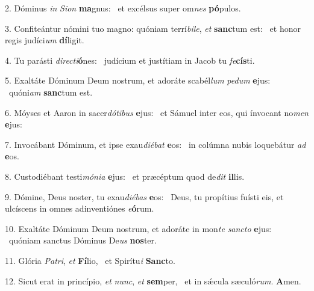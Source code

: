 2. Dóminus \textit{in} \textit{Si}\textit{on} \textbf{ma}gnus: \ast\  et excélsus super om\textit{nes} \textbf{pó}pulos.\

3. Confiteántur nómini tuo magno: quóniam terrí\textit{bi}\textit{le}, \textit{et} \textbf{sanc}tum est: \ast\  et honor regis judíci\textit{um} \textbf{dí}ligit.\

4. Tu parásti \textit{di}\textit{rec}\textit{ti}\textbf{ó}nes: \ast\  judícium et justítiam in Jacob tu \textit{fe}\textbf{cís}ti.\

5. Exaltáte Dóminum Deum nostrum, et adoráte scabél\textit{lum} \textit{pe}\textit{dum} \textbf{e}jus: \ast\  quóni\textit{am} \textbf{sanc}tum est.\

6. Móyses et Aaron in sacer\textit{dó}\textit{ti}\textit{bus} \textbf{e}jus: \ast\  et Sámuel inter eos, qui ínvocant no\textit{men} \textbf{e}jus:\

7. Invocábant Dóminum, et ipse exau\textit{di}\textit{é}\textit{bat} \textbf{e}os: \ast\  in colúmna nubis loquebátur \textit{ad} \textbf{e}os.\

8. Custodiébant testi\textit{mó}\textit{ni}\textit{a} \textbf{e}jus: \ast\  et præcéptum quod de\textit{dit} \textbf{il}lis.\

9. Dómine, Deus noster, tu exau\textit{di}\textit{é}\textit{bas} \textbf{e}os: \ast\  Deus, tu propítius fuísti eis, et ulcíscens in omnes adinventiónes \textit{e}\textbf{ó}rum.\

10. Exaltáte Dóminum Deum nostrum, et adoráte in mon\textit{te} \textit{sanc}\textit{to} \textbf{e}jus: \ast\  quóniam sanctus Dóminus De\textit{us} \textbf{nos}ter.\

11. Glória \textit{Pa}\textit{tri}, \textit{et} \textbf{Fí}lio, \ast\  et Spirítu\textit{i} \textbf{Sanc}to.\

12. Sicut erat in princípio, \textit{et} \textit{nunc}, \textit{et} \textbf{sem}per, \ast\  et in sǽcula sæculó\textit{rum}. \textbf{A}men.\

